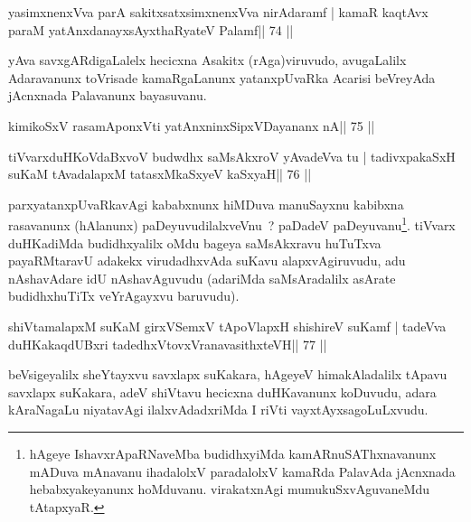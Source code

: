 \begin{shl}
yasimxnenxVva parA sakitxsatxsimxnenxVva nirAdaramf |
kamaR kaqtAvx paraM yatAnxdanayxsAyxthaRyateV Palamf\hfill || 74 ||
\end{shl}

\begin{artha}
yAva savxgARdigaLalelx hecicxna Asakitx (rAga)viruvudo, avugaLalilx Adaravanunx toVrisade kamaRgaLanunx yatanxpUvaRka Acarisi beVreyAda jAcnxnada Palavanunx bayasuvanu.
\end{artha}


\begin{shl}
kimikoSxV rasamAponxVti yatAnxninxSipxVDayananx nA\hfill || 75 ||
\end{shl}

\begin{shl}
tiVvarxduHKoVdaBxvoV budwdhx saMsAkxroV yAvadeVva tu |
tadivxpakaSxH suKaM tAvadalapxM tatasxMkaSxyeV kaSxyaH\hfill || 76 ||
\end{shl}

\begin{artha}
parxyatanxpUvaRkavAgi kababxnunx hiMDuva manuSayxnu kabibxna
rasavanunx (hAlanunx) paDeyuvudilalxveVnu~? paDadeV
paDeyuvanu\footnote{hAgeye IshavxrApaRNaveMba budidhxyiMda
  kamARnuSAThxnavanunx mADuva mAnavanu ihadalolxV paradalolxV kamaRda
  PalavAda jAcnxnada hebabxyakeyanunx hoMduvanu. virakatxnAgi
  mumukuSxvAguvaneMdu tAtapxyaR.}. tiVvarx duHKadiMda budidhxyalilx
oMdu bageya saMsAkxravu huTuTxva payaRMtaravU adakekx virudadhxvAda
suKavu alapxvAgiruvudu, adu nAshavAdare idU nAshavAguvudu (adariMda
saMsAradalilx asArate budidhxhuTiTx veYrAgayxvu baruvudu).
\end{artha}


\begin{shl}
shiVtamalapxM suKaM girxVSemxV tApoV\s lapxH shishireV suKamf |
tadeVva duHKakaqdUBxri tadedhxVtovxVranavasithxteVH\hfill || 77 ||
\end{shl}

\begin{artha}
  beVsigeyalilx sheYtayxvu savxlapx suKakara, hAgeyeV himakAladalilx
  tApavu savxlapx suKakara, adeV shiVtavu hecicxna duHKavanunx
  koDuvudu, adara kAraNagaLu niyatavAgi ilalxvAdadxriMda I
  riVti vayxtAyxsagoLuLxvudu.
\end{artha}

